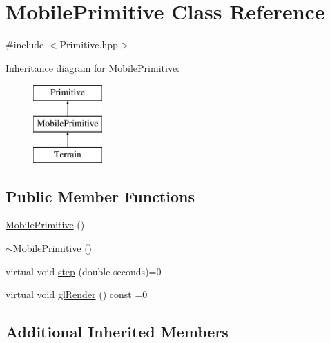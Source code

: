 \hypertarget{class_mobile_primitive}{\section{Mobile\-Primitive Class Reference}
\label{class_mobile_primitive}
}


{\ttfamily \#include $<$Primitive.\-hpp$>$}

Inheritance diagram for Mobile\-Primitive\-:\begin{figure}[H]
\begin{center}
\leavevmode
\includegraphics[height=3.000000cm]{class_mobile_primitive}
\end{center}
\end{figure}
\subsection*{Public Member Functions}
\begin{DoxyCompactItemize}
\item 
\hyperlink{class_mobile_primitive_a944bbf6ce02c59518d7ff004eac59ff1}{Mobile\-Primitive} ()
\item 
\hyperlink{class_mobile_primitive_a79b6e9202e7d3aca9d7bf4f45f61cf62}{$\sim$\-Mobile\-Primitive} ()
\item 
virtual void \hyperlink{class_mobile_primitive_afa5a61ea8a1785da95a041c5afe1fa9c}{step} (double seconds)=0
\item 
virtual void \hyperlink{class_mobile_primitive_afc11ee82cea8fda2919c01116178fe1d}{gl\-Render} () const =0
\end{DoxyCompactItemize}
\subsection*{Additional Inherited Members}


